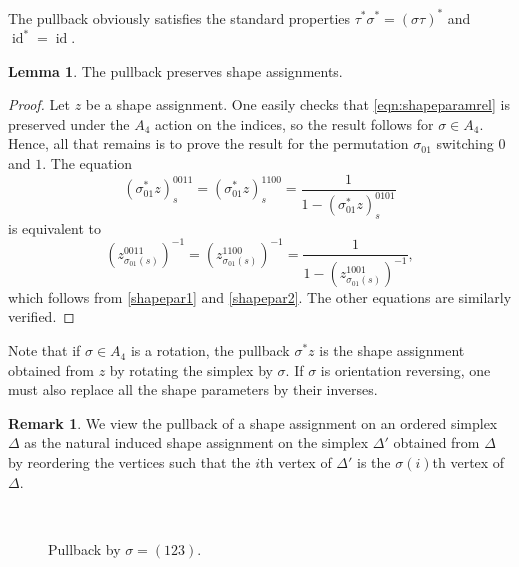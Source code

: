 \documentclass[12pt]{amsart}
\theoremstyle{definition}
\newtheorem{lemma}[theorem]{Lemma}
\newtheorem{remark}[theorem]{Remark}
\numberwithin{equation}{section}
\DeclareMathOperator{\id}{id}
\begin{document}
The pullback obviously satisfies the standard properties $\tau^*\sigma^*=(\sigma\tau)^*$ and $\id^*=\id$.

\begin{lemma}\label{shapesymmetries}
The pullback preserves shape assignments.
\end{lemma}

\begin{proof}
Let $z$ be a shape assignment. One easily checks that \eqref{eqn:shapeparamrel} is preserved under the $A_4$ action on the indices, so the result follows for $\sigma\in A_4$. Hence, all that remains is to prove the result for the permutation $\sigma_{01}$ switching $0$ and $1$. The equation
\begin{equation}
(\sigma_{01}^*z)_s^{0011}=(\sigma_{01}^*z)_s^{1100}=\frac{1}{1-(\sigma_{01}^*z)_s^{0101}}
\end{equation}
is equivalent to
\begin{equation}
(z^{0011}_{\sigma_{01}(s)})^{-1}=(z^{1100}_{\sigma_{01}(s)})^{-1}=\frac{1}{1-(z_{\sigma_{01}(s)}^{1001})^{-1}},
\end{equation}
which follows from \eqref{shapepar1} and \eqref{shapepar2}. The other equations are similarly verified.
\end{proof}

Note that if $\sigma\in A_4$ is a rotation, the pullback $\sigma^* z$ is the shape assignment obtained from $z$ by rotating the simplex by $\sigma$. If $\sigma$ is orientation reversing, one must also replace all the shape parameters by their inverses.

\begin{remark}\label{rm:reordering}%
We view the pullback of a shape assignment on an ordered simplex $\Delta$ as the natural induced shape assignment on the simplex $\Delta'$ obtained from $\Delta$ by reordering the vertices such that the $i$th vertex of $\Delta'$ is the $\sigma(i)$th vertex of $\Delta$.
\end{remark}

\begin{figure}[htb]
\begin{center}
\begin{minipage}[b]{0.45\textwidth}
 
\end{minipage}
\hfill
\begin{minipage}[b]{0.45\textwidth}

\end{minipage}
\\
\begin{minipage}[t]{0.45\textwidth}
\caption{Reordering by $\sigma=(123)$.}
\end{minipage}
\begin{minipage}[t]{0.45\textwidth}
\caption{Pullback by $\sigma=(123)$.}
\end{minipage}
\end{center} 
\end{figure}
\end{document}
